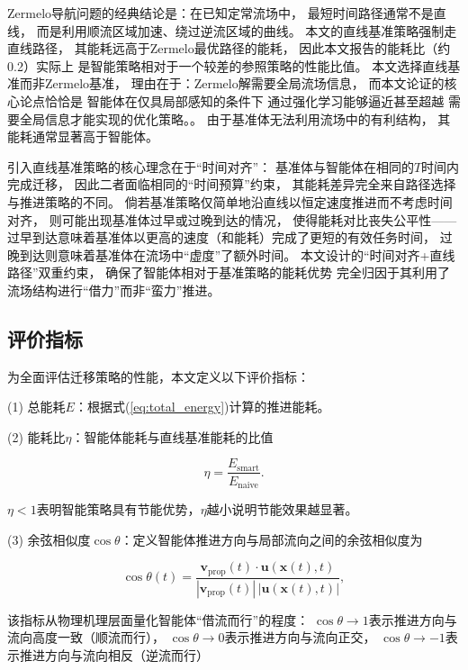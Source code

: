 Zermelo导航问题的经典结论是：在已知定常流场中，
最短时间路径通常不是直线，
而是利用顺流区域加速、绕过逆流区域的曲线。
本文的直线基准策略强制走直线路径，
其能耗远高于Zermelo最优路径的能耗，
因此本文报告的能耗比（约0.2）实际上
是智能策略相对于一个较差的参照策略的性能比值。
本文选择直线基准而非Zermelo基准，
理由在于：Zermelo解需要全局流场信息，
而本文论证的核心论点恰恰是
智能体在仅具局部感知的条件下
通过强化学习能够逼近甚至超越
需要全局信息才能实现的优化策略。。
由于基准体无法利用流场中的有利结构，
其能耗通常显著高于智能体。

引入直线基准策略的核心理念在于“时间对齐”：
基准体与智能体在相同的$T$时间内完成迁移，
因此二者面临相同的“时间预算”约束，
其能耗差异完全来自路径选择与推进策略的不同。
倘若基准策略仅简单地沿直线以恒定速度推进而不考虑时间对齐，
则可能出现基准体过早或过晚到达的情况，
使得能耗对比丧失公平性——
过早到达意味着基准体以更高的速度（和能耗）完成了更短的有效任务时间，
过晚到达则意味着基准体在流场中“虚度”了额外时间。
本文设计的“时间对齐+直线路径”双重约束，
确保了智能体相对于基准策略的能耗优势
完全归因于其利用了流场结构进行“借力”而非“蛮力”推进。


\subsection{评价指标}

为全面评估迁移策略的性能，本文定义以下评价指标：

(1) 总能耗$E$：根据式(\ref{eq:total_energy})计算的推进能耗。

(2) 能耗比$\eta$：智能体能耗与直线基准能耗的比值

\begin{equation}
    \eta = \frac{E_{\text{smart}}}{E_{\text{naive}}}.
    \label{eq:energy_ratio}
\end{equation}

$\eta < 1$表明智能策略具有节能优势，$\eta$越小说明节能效果越显著。

(3) 余弦相似度$\cos\theta$：定义智能体推进方向与局部流向之间的余弦相似度为

\begin{equation}
    \cos\theta(t) = \frac{\mathbf{v}_{\text{prop}}(t) \cdot \mathbf{u}(\mathbf{x}(t), t)}
                          {|\mathbf{v}_{\text{prop}}(t)| \, |\mathbf{u}(\mathbf{x}(t), t)|},
    \label{eq:cosine_similarity}
\end{equation}

该指标从物理机理层面量化智能体“借流而行”的程度：
$\cos\theta \to 1$表示推进方向与流向高度一致（顺流而行），
$\cos\theta \to 0$表示推进方向与流向正交，
$\cos\theta \to -1$表示推进方向与流向相反（逆流而行）

